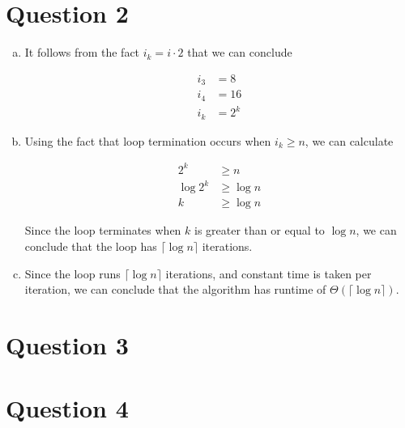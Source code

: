 \documentclass[12pt]{article}
\begin{document}
\section*{Question 2}
\begin{enumerate}[a.]
    \item

    It follows from the fact $i_k = i \cdot 2$ that we can conclude

    \begin{align*}
    i_3 &= 8\\
    i_4 &= 16\\
    i_k &= 2^k
    \end{align*}

    \item

    Using the fact that loop termination occurs when $i_k \geq n$, we can
    calculate

    \setcounter{equation}{0}
    \begin{align}
        2^k &\geq n\\
        \log 2^k &\geq \log n\\
        k &\geq \log n
    \end{align}

    \bigskip

    Since the loop terminates when $k$ is greater than or equal to $\log n$, we
    can conclude that the loop has $\lceil \log n \rceil$ iterations.

    \item

    Since the loop runs $\lceil \log n \rceil$ iterations, and constant time is
    taken per iteration, we can conclude that the algorithm has runtime of
    $\Theta(\lceil \log n \rceil)$.

\end{enumerate}

\section*{Question 3}

\section*{Question 4}
\end{document}
